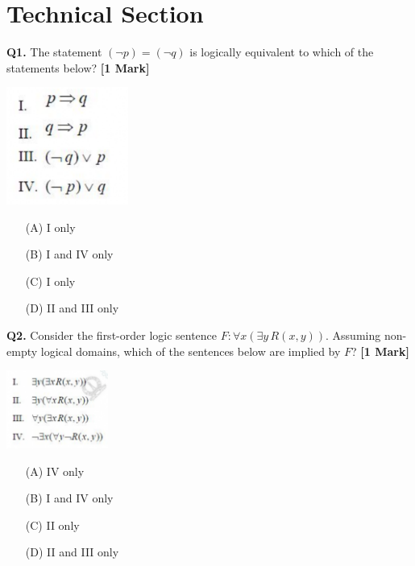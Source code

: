 \documentclass[11pt]{article}
\newcommand{\questiona}[2]{
    \noindent\textbf{Q#2.} #1 \hfill \textbf{[1 Mark]}
}
\begin{document}
\section*{Technical Section}

\questiona{The statement \( (\neg p) = (\neg q)\) is logically equivalent to which of the statements below?}{1}
\begin{center}
\includegraphics[width=0.3\textwidth]{figures/1.png}
\end{center}
\begin{enumerate}
    \item[(A)] I only  
    \item[(B)] I and IV only  
    \item[(C)] I only  
    \item[(D)] II and III only  
\end{enumerate}
\vspace{0.5cm}

\questiona{Consider the first-order logic sentence \( F: \forall x (\exists y\, R(x,y)) \). Assuming non-empty logical domains, which of the sentences below are implied by \( F \)?}{2}
\begin{center}
\includegraphics[width=0.25\textwidth]{figures/2.png}
\end{center}
\begin{enumerate}
    \item[(A)] IV only  
    \item[(B)] I and IV only  
    \item[(C)] II only  
    \item[(D)] II and III only  
\end{enumerate}
\vspace{0.5cm}
\end{document}
